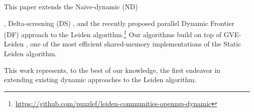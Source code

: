 This paper extends the Naive-dynamic (ND) \cite{com-aynaud10}, Delta-screening (DS) \cite{com-zarayeneh21}, and the recently proposed parallel Dynamic Frontier (DF) approach \cite{sahu2024shared} to the Leiden algorithm.\footnote{\url{https://github.com/puzzlef/leiden-communities-openmp-dynamic}} Our algorithms build on top of GVE-Leiden \cite{sahu2024fast}, one of the most efficient shared-memory implementations of the Static Leiden algorithm. This work represents, to the best of our knowledge, the first endeavor in extending existing dynamic approaches to the Leiden algorithm.





